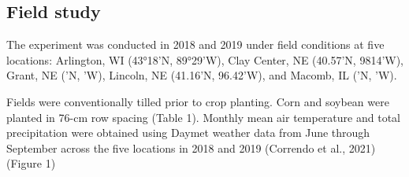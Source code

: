 \documentclass[utf8]{frontiersSCNS}
\begin{document}
\hypertarget{field-study}{%
\subsection*{Field study}\label{field-study}}

The experiment was conducted in 2018 and 2019 under field conditions at
five locations: Arlington, WI (43°18'N, 89°29'W), Clay Center, NE
(40.57'N, 9814'W), Grant, NE ('N, 'W), Lincoln, NE (41.16'N, 96.42'W),
and Macomb, IL ('N, 'W).

Fields were conventionally tilled prior to crop planting. Corn and
soybean were planted in 76-cm row spacing (Table 1). Monthly mean air
temperature and total precipitation were obtained using Daymet weather
data from June through September across the five locations in 2018 and
2019 (Correndo et al., 2021) (Figure 1)
\end{document}
